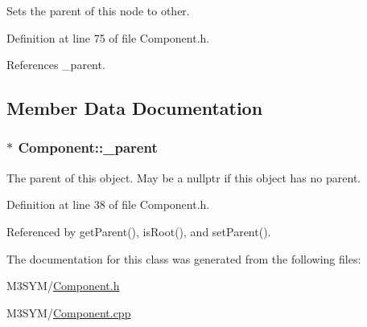 Sets the parent of this node to other. 



Definition at line 75 of file Component.\+h.



References \+\_\+parent.



\subsection{Member Data Documentation}
\hypertarget{classComponent_a74c227d53f7fd87f14421326ee63045a}{
\subsubsection[{\+\_\+parent}]{$\ast$ Component\+::\+\_\+parent\hspace{0.3cm}{\ttfamily [private]}}}\label{classComponent_a74c227d53f7fd87f14421326ee63045a}


The parent of this object. May be a nullptr if this object has no parent. 



Definition at line 38 of file Component.\+h.



Referenced by get\+Parent(), is\+Root(), and set\+Parent().



The documentation for this class was generated from the following files\+:\begin{DoxyCompactItemize}
\item 
M3\+S\+Y\+M/\hyperlink{Component_8h}{Component.\+h}\item 
M3\+S\+Y\+M/\hyperlink{Component_8cpp}{Component.\+cpp}\end{DoxyCompactItemize}
